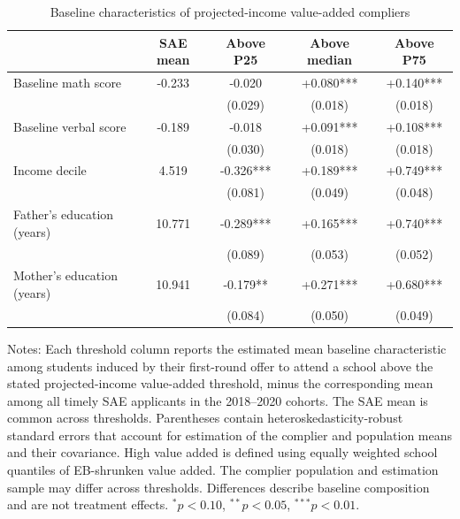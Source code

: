 \begin{table}[!htbp]
\centering
\caption{Baseline characteristics of projected-income value-added compliers}
\label{tab:program-income-va-complier-ses}
\begin{threeparttable}
\small
\setlength{\tabcolsep}{4pt}
\begin{tabular}{lcccc}
\toprule
 & SAE mean & Above P25 & Above median & Above P75 \\
\midrule
Baseline math score & -0.233 & -0.020 & +0.080*** & +0.140*** \\
 &  & (0.029) & (0.018) & (0.018) \\
Baseline verbal score & -0.189 & -0.018 & +0.091*** & +0.108*** \\
 &  & (0.030) & (0.018) & (0.018) \\
Income decile & 4.519 & -0.326*** & +0.189*** & +0.749*** \\
 &  & (0.081) & (0.049) & (0.048) \\
Father's education (years) & 10.771 & -0.289*** & +0.165*** & +0.740*** \\
 &  & (0.089) & (0.053) & (0.052) \\
Mother's education (years) & 10.941 & -0.179** & +0.271*** & +0.680*** \\
 &  & (0.084) & (0.050) & (0.049) \\
\bottomrule
\end{tabular}
\begin{tablenotes}[flushleft]
\footnotesize
\item Notes: Each threshold column reports the estimated mean baseline characteristic among students induced by their first-round offer to attend a school above the stated projected-income value-added threshold, minus the corresponding mean among all timely SAE applicants in the 2018--2020 cohorts. The SAE mean is common across thresholds. Parentheses contain heteroskedasticity-robust standard errors that account for estimation of the complier and population means and their covariance. High value added is defined using equally weighted school quantiles of EB-shrunken value added. The complier population and estimation sample may differ across thresholds. Differences describe baseline composition and are not treatment effects. $^{*}p<0.10$, $^{**}p<0.05$, $^{***}p<0.01$.
\end{tablenotes}
\end{threeparttable}
\end{table}
